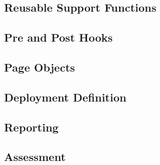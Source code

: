 \subsection{Reusable Support Functions}
\label{subsec:reusable-support-functions}

\subsection{Pre and Post Hooks}
\label{subsec:pre-and-post-hooks}

\subsection{Page Objects}
\label{subsec:page-objects}

\subsection{Deployment Definition}
\label{subsec:deployment-definition}

\subsection{Reporting}
\label{subsec:reporting}

\subsection{Assessment}
\label{subsec:assessment}
